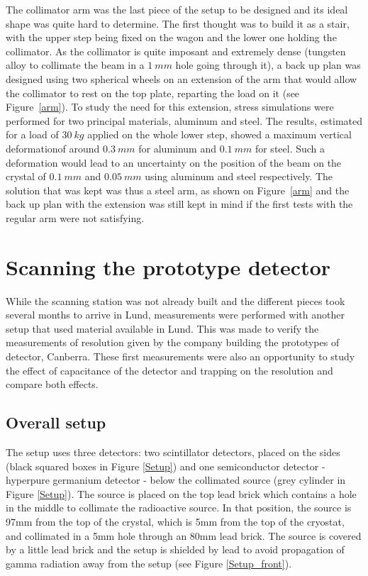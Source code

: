 \documentclass[11pt,a4paper]{article}
\begin{document}
The collimator arm was the last piece of the setup to be designed and its ideal shape was quite hard to determine. The first thought was to build it as a stair, with the upper step being fixed on the wagon and the lower one holding the collimator. As the collimator is quite imposant and extremely dense (tungsten alloy to collimate the beam in a $1~mm$ hole going through it), a back up plan was designed using two spherical wheels on an extension of the arm that would allow the collimator to rest on the top plate, reparting the load on it (see Figure~\ref{arm}). To study the need for this extension, stress simulations were performed for two principal materials, aluminum and steel. The results, estimated for a load of $30~kg$ applied on the whole lower step, showed a maximum vertical deformationof around $0.3~mm$ for aluminum and $0.1~mm$ for steel. Such a deformation would lead to an uncertainty on the position of the beam on the crystal of $0.1~mm$ and $0.05~mm$ using aluminum and steel respectively. The solution that was kept was thus a steel arm, as shown on Figure~\ref{arm} and the back up plan with the extension was still kept in mind if the first tests with the regular arm were not satisfying.

\newpage

\section{Scanning the prototype detector}

While the scanning station was not already built and the different pieces took several months to arrive in Lund, measurements were performed with another setup that used material available in Lund. This was made to verify the measurements of resolution given by the company building the prototypes of detector, Canberra. These first measurements were also an opportunity to study the effect of capacitance of the detector and trapping on the resolution and compare both effects.

\subsection{Overall setup} \label{setup}

The setup uses three detectors: two scintillator detectors, placed on the sides (black squared boxes in Figure \ref{Setup}) and one semiconductor detector - hyperpure germanium detector - below the collimated source (grey cylinder in Figure \ref{Setup}). The source is placed on the top lead brick which contains a hole in the middle to collimate the radioactive source. In that position, the source is 97mm from the top of the crystal, which is 5mm from the top of the cryostat, and collimated in a 5mm hole through an 80mm lead brick. The source is covered by a little lead brick and the setup is shielded by lead to avoid propagation of gamma radiation away from the setup (see Figure \ref{Setup_front}).
\end{document}
